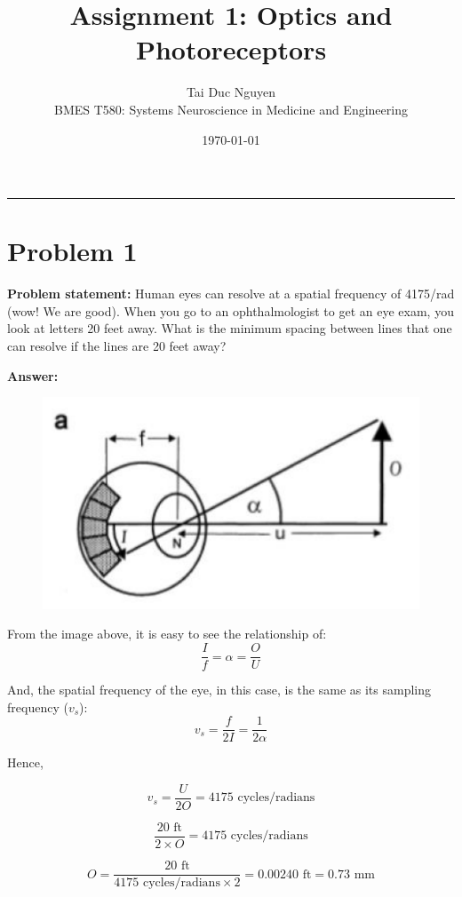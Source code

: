 \documentclass[letterpaper, 11pt]{article}
\title{Assignment 1: Optics and Photoreceptors}
\author{
Tai Duc Nguyen \\
BMES T580: Systems Neuroscience in Medicine and Engineering
}
\date{\today}
\begin{document}
\maketitle

\rule{\textwidth}{1pt}

\section{Problem 1}
\label{sec:prob1}
\textbf{Problem statement:} Human eyes can resolve at a spatial frequency of 4175/rad (wow! We are good). When you go to an ophthalmologist to get an eye exam, you look at letters 20 feet away. What is the minimum spacing between lines that one can resolve if the lines are 20 feet away?

\textbf{Answer:}

\begin{figure}[htb!]
	\centering
	\includegraphics[width=0.6\linewidth]{1_fig.png}
	\caption{}
	\label{fig1}
\end{figure}

From the image above, it is easy to see the relationship of:
\begin{equation}
	\frac{I}{f} = \alpha = \frac{O}{U}
\end{equation}

And, the spatial frequency of the eye, in this case, is the same as its sampling frequency ($v_s$):
\begin{equation}
	v_s = \frac{f}{2I} = \frac{1}{2\alpha}
\end{equation}

Hence,

\begin{equation}
	v_s = \frac{U}{2O} = 4175 \text{ cycles/radians}
\end{equation}

\begin{equation}
	\frac{20 \text{ ft}}{2\times O} = 4175 \text{ cycles/radians}
\end{equation}

\begin{equation}
	O = \frac{20 \text{ ft}}{4175 \text{ cycles/radians} \times 2} = 0.00240 \text{ ft} = 0.73 \text{ mm}
\end{equation}
\end{document}
